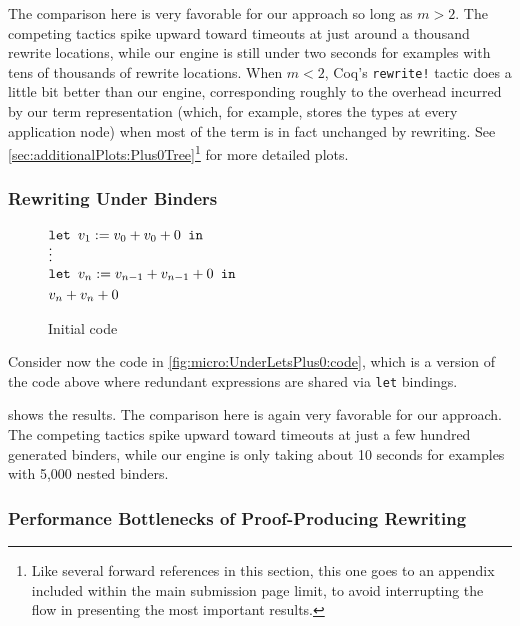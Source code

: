 The comparison here is very favorable for our approach so long as $m > 2$.
The competing tactics spike upward toward timeouts at just around a thousand rewrite locations, while our engine is still under two seconds for examples with tens of thousands of rewrite locations.
When $m < 2$, Coq's \texttt{rewrite!} tactic does a little bit better than our engine, corresponding roughly to the overhead incurred by our term representation (which, for example, stores the types at every application node) when most of the term is in fact unchanged by rewriting.
See \autoref{sec:additionalPlots:Plus0Tree}\footnote{Like several forward references in this section, this one goes to an appendix included within the main submission page limit, to avoid interrupting the flow in presenting the most important results.} for more detailed plots.

\subsubsection{Rewriting Under Binders}\label{sec:micro:UnderLetsPlus0}

\begin{figure}
{\small $\begin{aligned}
  & \letin[{v_1 := v_0 + v_0 + 0}{}] \\ \noalign{\vskip-7pt}
  & \vdots \\ \noalign{\vskip-3pt}
  & \letin[{v_n := v_{n-1} + v_{n-1} + 0}{}] \\
  & v_n + v_n + 0
\end{aligned}$}%
\caption{\label{fig:micro:UnderLetsPlus0:code}Initial code}
\end{figure}

Consider now the code in \autoref{fig:micro:UnderLetsPlus0:code}, which is a version of the code above where redundant expressions are shared via \texttt{let} bindings.

 shows the results.
The comparison here is again very favorable for our approach.
The competing tactics spike upward toward timeouts at just a few hundred generated binders, while our engine is only taking about 10 seconds for examples with 5,000 nested binders.

\subsubsection{Performance Bottlenecks of Proof-Producing Rewriting}\label{sec:micro:setoid-rewrite-bottlenecks-lite}\label{sec:setoid-rewrite-bottlenecks}

